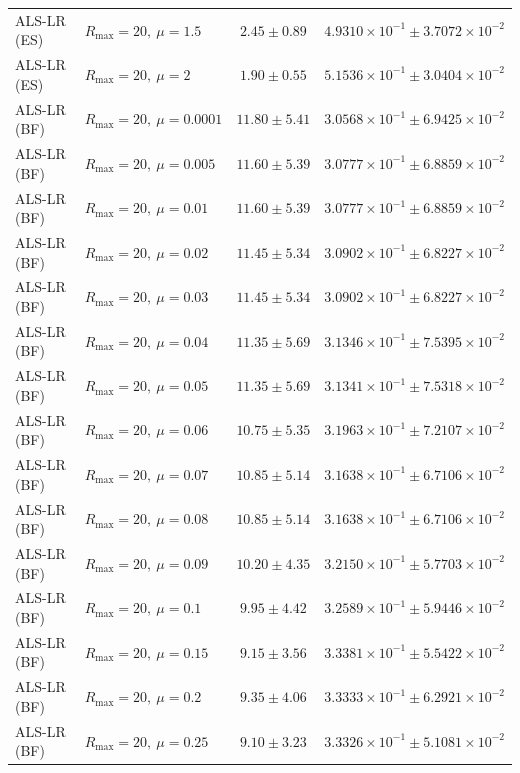 \begin{table}[t]
\begin{tabular}{@{}llcc@{}}
ALS-LR (ES) & \(R_{\max}=20,\ \mu=1.5\) & \(2.45 \pm 0.89\) & \(4.9310{\times}10^{-1} \pm 3.7072{\times}10^{-2}\) \\
ALS-LR (ES) & \(R_{\max}=20,\ \mu=2\) & \(1.90 \pm 0.55\) & \(5.1536{\times}10^{-1} \pm 3.0404{\times}10^{-2}\) \\
ALS-LR (BF) & \(R_{\max}=20,\ \mu=0.0001\) & \(11.80 \pm 5.41\) & \(3.0568{\times}10^{-1} \pm 6.9425{\times}10^{-2}\) \\
ALS-LR (BF) & \(R_{\max}=20,\ \mu=0.005\) & \(11.60 \pm 5.39\) & \(3.0777{\times}10^{-1} \pm 6.8859{\times}10^{-2}\) \\
ALS-LR (BF) & \(R_{\max}=20,\ \mu=0.01\) & \(11.60 \pm 5.39\) & \(3.0777{\times}10^{-1} \pm 6.8859{\times}10^{-2}\) \\
ALS-LR (BF) & \(R_{\max}=20,\ \mu=0.02\) & \(11.45 \pm 5.34\) & \(3.0902{\times}10^{-1} \pm 6.8227{\times}10^{-2}\) \\
ALS-LR (BF) & \(R_{\max}=20,\ \mu=0.03\) & \(11.45 \pm 5.34\) & \(3.0902{\times}10^{-1} \pm 6.8227{\times}10^{-2}\) \\
ALS-LR (BF) & \(R_{\max}=20,\ \mu=0.04\) & \(11.35 \pm 5.69\) & \(3.1346{\times}10^{-1} \pm 7.5395{\times}10^{-2}\) \\
ALS-LR (BF) & \(R_{\max}=20,\ \mu=0.05\) & \(11.35 \pm 5.69\) & \(3.1341{\times}10^{-1} \pm 7.5318{\times}10^{-2}\) \\
ALS-LR (BF) & \(R_{\max}=20,\ \mu=0.06\) & \(10.75 \pm 5.35\) & \(3.1963{\times}10^{-1} \pm 7.2107{\times}10^{-2}\) \\
ALS-LR (BF) & \(R_{\max}=20,\ \mu=0.07\) & \(10.85 \pm 5.14\) & \(3.1638{\times}10^{-1} \pm 6.7106{\times}10^{-2}\) \\
ALS-LR (BF) & \(R_{\max}=20,\ \mu=0.08\) & \(10.85 \pm 5.14\) & \(3.1638{\times}10^{-1} \pm 6.7106{\times}10^{-2}\) \\
ALS-LR (BF) & \(R_{\max}=20,\ \mu=0.09\) & \(10.20 \pm 4.35\) & \(3.2150{\times}10^{-1} \pm 5.7703{\times}10^{-2}\) \\
ALS-LR (BF) & \(R_{\max}=20,\ \mu=0.1\) & \(9.95 \pm 4.42\) & \(3.2589{\times}10^{-1} \pm 5.9446{\times}10^{-2}\) \\
ALS-LR (BF) & \(R_{\max}=20,\ \mu=0.15\) & \(9.15 \pm 3.56\) & \(3.3381{\times}10^{-1} \pm 5.5422{\times}10^{-2}\) \\
ALS-LR (BF) & \(R_{\max}=20,\ \mu=0.2\) & \(9.35 \pm 4.06\) & \(3.3333{\times}10^{-1} \pm 6.2921{\times}10^{-2}\) \\
ALS-LR (BF) & \(R_{\max}=20,\ \mu=0.25\) & \(9.10 \pm 3.23\) & \(3.3326{\times}10^{-1} \pm 5.1081{\times}10^{-2}\) \\

\end{tabular}
\end{table}
